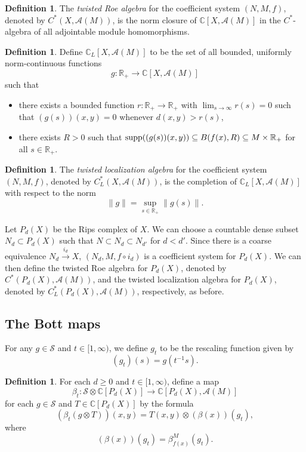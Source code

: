 \documentclass{article}
\theoremstyle{plain}
\theoremstyle{definition}
\newtheorem{definition}[theorem]{Definition}
\theoremstyle{remark}
\def\A{\mathcal A}
\def\IC{\mathbb C}
\def\S{\mathcal S}
\begin{document}
	\begin{definition}
		The \emph{twisted Roe algebra} for the coefficient system $(N,M,f)$, denoted by $C^*(X,\mathcal A(M))$, is the norm closure of $\mathbb C[X,\mathcal A(M)]$ in the $C^*$-algebra of all adjointable module homomorphisms.
	\end{definition}
	
	\begin{definition}\label{twistedlocalization}
		Define $\mathbb C_L[X,\mathcal A(M)]$ to be the set of all bounded, uniformly norm-continuous functions
		$$g:\mathbb R_+\to\mathbb C[X,\mathcal A(M)]$$
		such that\begin{itemize}
			\item[(1)] there exists a bounded function $r:\mathbb R_+\to\mathbb R_+$ with $\lim_{s\to\infty}r(s)=0$ such that $(g(s))(x,y)=0$ whenever $d(x,y)>r(s)$,
			\item[(2)] there exists $R>0$ such that $\textup{supp}((g(s))(x,y))\subseteq B(f(x),R)\subseteq M\times\mathbb R_+$ for all $s\in\mathbb R_+$.
	\end{itemize}\end{definition}
	
	\begin{definition}
		The \emph{twisted localization algebra} for the coefficient system $(N,M,f)$, denoted by $C^*_L(X,\mathcal A(M))$, is the completion of $\mathbb C_L[X,\mathcal A(M)]$ with respect to the norm
		$$\|g\|=\sup_{s\in\mathbb R_+}\|g(s)\|.$$
	\end{definition}
	
	Let $P_d(X)$ be the Rips complex of $X$. We can choose a countable dense subset $N_d\subset P_d(X)$ such that $N\subset N_d\subset N_{d'}$ for $d<d'$. Since there is a coarse equivalence $N_d\xrightarrow{i_d}X$, $(N_d,M,f\circ i_d)$ is a coefficient system for $P_d(X)$. We can then define the twisted Roe algebra for $P_d(X)$, denoted by $C^*(P_d(X),\mathcal A(M))$, and the twisted localization algebra for $P_d(X)$, denoted by $C^*_L(P_d(X),\mathcal A(M))$, respectively, as before.
	\subsection{The Bott maps}
	For any $g\in\S$ and $t\in[1,\infty)$, we define $g_t$ to be the rescaling function given by
	$$(g_t)(s)=g(t^{-1}s).$$ 
	\begin{definition}
		For each $d\geq 0$ and $t\in[1,\infty)$, define a map
		$$\beta_t:\S\otimes\IC[P_d(X)]\to\IC[P_d(X),\A(M)]$$
		for each $g\in\S$ and $T\in\IC[P_d(X)]$ by the formula
		$$(\beta_t(g\otimes T))(x,y)=T(x,y)\otimes(\beta(x))(g_t),$$
		where
		$$(\beta(x))(g_t)=\beta_{f(x)}^M(g_t).$$
	\end{definition}
	
\end{document}
